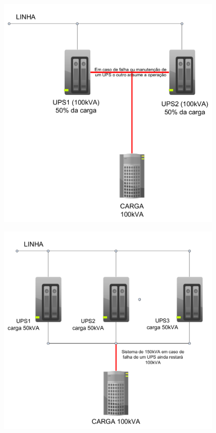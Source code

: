 \begin{enumerate}
\begin{figure}[H]
\begin{minipage}{0.45\textwidth}
			\includegraphics[width=\textwidth]{Figures/7. nobreak/redundancia2.png}
			\label{fig: redundancia2}
		\end{minipage}
	\end{figure}
	\begin{figure}[H]
	\centering
		\begin{minipage}{0.45\textwidth}
			\centering
			\includegraphics[width=\textwidth]{Figures/7. nobreak/redundancia3.png}

\end{minipage}
\end{figure}
\end{enumerate}
